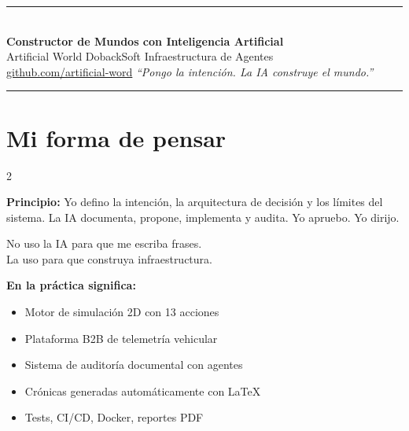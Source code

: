 \documentclass[10pt,a4paper]{article}
\begin{document}

\begin{center}
  {\color{accent}\rule{\linewidth}{2.5pt}}\\[0.6em]
  {\LARGE\bfseries\color{dark} Constructor de Mundos con Inteligencia Artificial}\\[0.3em]
  {\large\color{accent} Artificial World \textperiodcentered{} DobackSoft \textperiodcentered{} Infraestructura de Agentes}\\[0.3em]
  {\small\color{muted}
    \href{https://github.com}{github.com/artificial-word}
    \quad\textperiodcentered{}
    \quad\textperiodcentered\quad
    \textit{``Pongo la intenci\'on. La IA construye el mundo.''}
  }\\[0.5em]
  {\color{accent}\rule{\linewidth}{2.5pt}}
\end{center}

\vspace{0.3em}

\section{Mi forma de pensar}

\begin{multicols}{2}

\noindent\colorbox{accent!8}{\parbox{0.44\textwidth}{%
  \textbf{Principio:} Yo defino la intenci\'on, la arquitectura de
  decisi\'on y los l\'imites del sistema.
  La IA documenta, propone, implementa y audita.
  Yo apruebo. Yo dirijo.
  \medskip

  No uso la IA para que me escriba frases.\\
  La uso para que construya infraestructura.
}}

\columnbreak

\noindent\colorbox{light}{\parbox{0.44\textwidth}{%
  \raggedright
  \textbf{En la pr\'actica significa:}
  \begin{itemize}[leftmargin=1em, itemsep=1pt, topsep=2pt]
    \item Motor de simulaci\'on 2D con 13 acciones
    \item Plataforma B2B de telemetr\'ia vehicular
    \item Sistema de auditor\'ia documental con agentes
    \item Cr\'onicas generadas autom\'aticamente con \LaTeX{}
    \item Tests, CI/CD, Docker, reportes PDF
  \end{itemize}
}}

\end{multicols}
\end{document}
